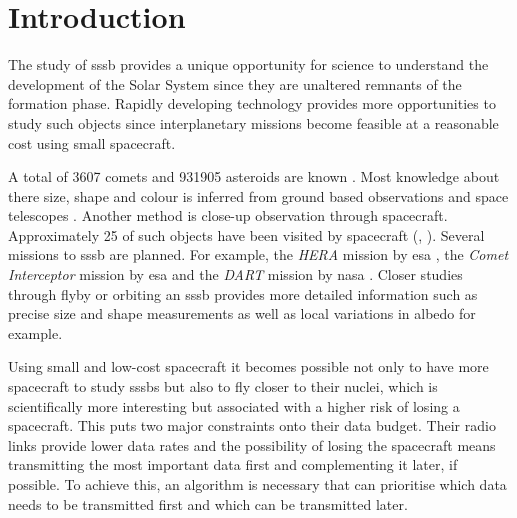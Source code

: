 \section{Introduction} \label{sec:introduction}


The study of \gls{sssb} provides a unique opportunity for science to understand the development of the Solar System since they are unaltered remnants of the formation phase. Rapidly developing technology provides more opportunities to study such objects since interplanetary missions become feasible at a reasonable cost using small spacecraft. 

A total of \SI{3607}{} comets and \SI{931905}{} asteroids are known \cite{nasaSBD_count}. Most knowledge about there size, shape and colour is inferred from ground based observations and space telescopes \cite{bowles2018castaway}. Another method is close-up observation through spacecraft. Approximately \SI{25}{} of such objects have been visited by spacecraft (\cite{wikipediaVisitedList}, \cite{nasaSBD_missions}). Several missions to \gls{sssb} are planned. For example, the \textit{HERA} mission by \gls{esa} \cite{hera}, the \textit{Comet Interceptor} mission by \gls{esa} \cite{snodgrass2019europeanCI} and the \textit{DART} mission by \gls{nasa} \cite{talbert_2017DART}. Closer studies through flyby or orbiting an \gls{sssb} provides more detailed information such as precise size and shape measurements as well as local variations in albedo for example.

Using small and low-cost spacecraft it becomes possible not only to have more spacecraft to study \gls{sssb}s but also to fly closer to their nuclei, which is scientifically more interesting but associated with a higher risk of losing a spacecraft. This puts two major constraints onto their data budget. Their radio links provide lower data rates and the possibility of losing the spacecraft means transmitting the most important data first and complementing it later, if possible. To achieve this, an algorithm is necessary that can prioritise which data needs to be transmitted first and which can be transmitted later.

